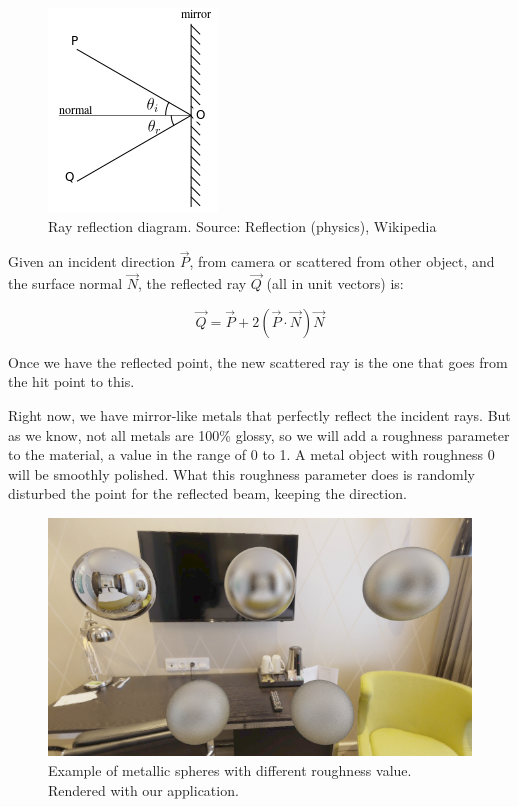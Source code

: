 \documentclass[titlepage,12pt]{report}
\begin{document}
\begin{figure}[H]
	\centering
	\includegraphics[scale=0.65]{media/Reflection_angles.png}
	\caption{Ray reflection diagram. Source: Reflection (physics), Wikipedia }
	\label{metal1}
\end{figure}

Given an incident direction $\vec{P}$, from camera or scattered from other object, and the surface normal $\vec{N}$, the reflected ray $\vec{Q}$ (all in unit vectors) is:

\begin{equation}
	\vec{Q} = \vec{P} + 2(\vec{P}\cdot\vec{N})\vec{N}
\end{equation}

Once we have the reflected point, the new scattered ray is the one that goes from the hit point to this.

Right now, we have mirror-like metals that perfectly reflect the incident rays. But as we know, not all metals are 100\% glossy, so we will add a roughness parameter to the material, a value in the range of 0 to 1. A metal object with roughness 0 will be smoothly polished. What this roughness parameter does is randomly disturbed the point for the reflected beam, keeping the direction.

\begin{figure}[H]
	\centering
	\includegraphics[scale=0.65]{media/example_metals.png}
	\caption{Example of metallic spheres with different roughness value. Rendered with our application.}
	\label{metal2}
\end{figure}
\end{document}
